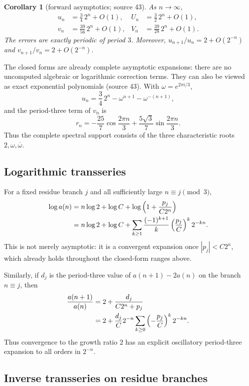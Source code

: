 \documentclass[11pt,a4paper]{article}
\numberwithin{equation}{section}
\newtheorem{corollary}[theorem]{Corollary}
\theoremstyle{definition}
\theoremstyle{remark}
\theoremstyle{plain}
\newcommand{\src}[1]{\textup{(source #1)}}
\begin{document}
\begin{corollary}[forward asymptotics; source 43]\label{gdf:cor:forward-asymptotics}
As $n\to\infty$,
\begin{align*}
 u_n&=\frac34\,2^n+O(1),
 &U_n&=\frac32\,2^n+O(1),\\
 v_n&=\frac{39}{56}\,2^n+O(1),
 &V_n&=\frac{39}{28}\,2^n+O(1).
\end{align*}
The errors are exactly periodic of period $3$.  Moreover,
$u_{n+1}/u_n=2+O(2^{-n})$ and $v_{n+1}/v_n=2+O(2^{-n})$.
\end{corollary}

The closed forms are already complete asymptotic expansions: there are no
uncomputed algebraic or logarithmic correction terms.  They can also be viewed
as exact exponential polynomials \src{43}.  With $\omega=e^{2\pi i/3}$,
\[
 u_n=\frac34\,2^n-\omega^{n+1}-\omega^{-(n+1)},
\]
and the period-three term of $v_n$ is
\[
 r_n=-\frac{25}{7}\cos\frac{2\pi n}{3}
 +\frac{5\sqrt3}{7}\sin\frac{2\pi n}{3}.
\]
Thus the complete spectral support consists of the three characteristic roots
$2,\omega,\overline\omega$.

\subsection{Logarithmic transseries}

For a fixed residue branch $j$ and all sufficiently large $n\equiv j\pmod3$,
\begin{align}
 \log a(n)
 &=n\log2+\log C+
   \log\left(1+\frac{p_j}{C2^n}\right)\notag\\
 &=n\log2+\log C+
   \sum_{k\ge1}\frac{(-1)^{k+1}}{k}
   \left(\frac{p_j}{C}\right)^k2^{-kn}.
 \label{gdf:eq:log-transseries}
\end{align}
This is not merely asymptotic: it is a convergent expansion once
$|p_j|<C2^n$, which already holds throughout the closed-form ranges above.

Similarly, if $d_j$ is the period-three value of $a(n+1)-2a(n)$ on the branch
$n\equiv j$, then
\begin{align}
 \frac{a(n+1)}{a(n)}
 &=2+\frac{d_j}{C2^n+p_j}\notag\\
 &=2+\frac{d_j}{C}2^{-n}
   \sum_{k\ge0}\left(-\frac{p_j}{C}\right)^k2^{-kn}.
 \label{gdf:eq:ratio-transseries}
\end{align}
Thus convergence to the growth ratio $2$ has an explicit oscillatory
period-three expansion to all orders in $2^{-n}$.

\subsection{Inverse transseries on residue branches}\label{gdf:sec:inverse}
\end{document}
